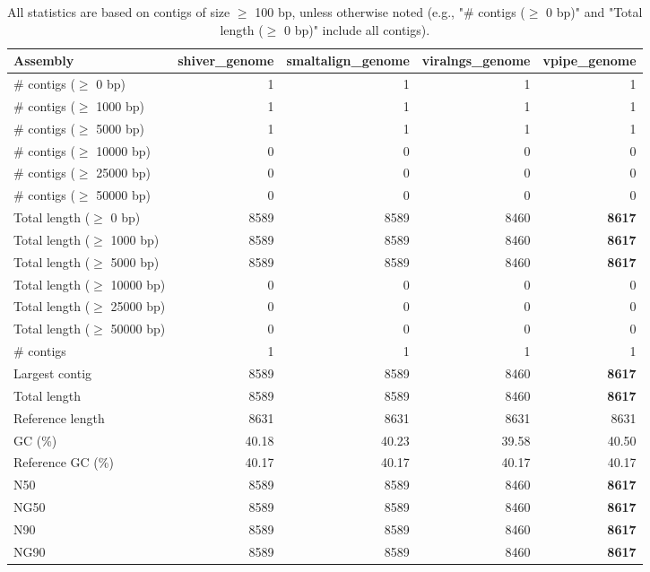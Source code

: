 \documentclass[12pt,a4paper]{article}
\begin{document}
\begin{table}[ht]
\begin{center}
\caption{All statistics are based on contigs of size $\geq$ 100 bp, unless otherwise noted (e.g., "\# contigs ($\geq$ 0 bp)" and "Total length ($\geq$ 0 bp)" include all contigs).}
\begin{tabular}{|l*{4}{|r}|}
\hline
Assembly & shiver\_genome & smaltalign\_genome & viralngs\_genome & vpipe\_genome \\ \hline
\# contigs ($\geq$ 0 bp) & 1 & 1 & 1 & 1 \\ \hline
\# contigs ($\geq$ 1000 bp) & 1 & 1 & 1 & 1 \\ \hline
\# contigs ($\geq$ 5000 bp) & 1 & 1 & 1 & 1 \\ \hline
\# contigs ($\geq$ 10000 bp) & 0 & 0 & 0 & 0 \\ \hline
\# contigs ($\geq$ 25000 bp) & 0 & 0 & 0 & 0 \\ \hline
\# contigs ($\geq$ 50000 bp) & 0 & 0 & 0 & 0 \\ \hline
Total length ($\geq$ 0 bp) & 8589 & 8589 & 8460 & {\bf 8617} \\ \hline
Total length ($\geq$ 1000 bp) & 8589 & 8589 & 8460 & {\bf 8617} \\ \hline
Total length ($\geq$ 5000 bp) & 8589 & 8589 & 8460 & {\bf 8617} \\ \hline
Total length ($\geq$ 10000 bp) & 0 & 0 & 0 & 0 \\ \hline
Total length ($\geq$ 25000 bp) & 0 & 0 & 0 & 0 \\ \hline
Total length ($\geq$ 50000 bp) & 0 & 0 & 0 & 0 \\ \hline
\# contigs & 1 & 1 & 1 & 1 \\ \hline
Largest contig & 8589 & 8589 & 8460 & {\bf 8617} \\ \hline
Total length & 8589 & 8589 & 8460 & {\bf 8617} \\ \hline
Reference length & 8631 & 8631 & 8631 & 8631 \\ \hline
GC (\%) & 40.18 & 40.23 & 39.58 & 40.50 \\ \hline
Reference GC (\%) & 40.17 & 40.17 & 40.17 & 40.17 \\ \hline
N50 & 8589 & 8589 & 8460 & {\bf 8617} \\ \hline
NG50 & 8589 & 8589 & 8460 & {\bf 8617} \\ \hline
N90 & 8589 & 8589 & 8460 & {\bf 8617} \\ \hline
NG90 & 8589 & 8589 & 8460 & {\bf 8617} \\ \hline

\end{tabular}
\end{center}
\end{table}
\end{document}
